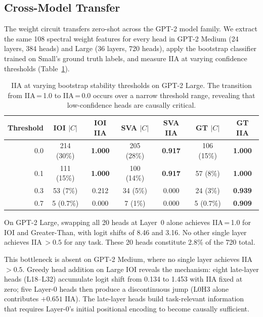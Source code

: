 \documentclass{article}
\newcommand{\NUM}[1]{\textbf{#1}}
\begin{document}
\subsection{Cross-Model Transfer}

The weight circuit transfers zero-shot across the GPT-2 model family.
We extract the same 108 spectral weight features for every head in
GPT-2 Medium (24 layers, 384 heads) and Large (36 layers, 720 heads),
apply the bootstrap classifier trained on Small's ground truth labels,
and measure IIA at varying confidence thresholds
(Table~\ref{tab:cross_model}).

\begin{table}[h]
\centering
\caption{IIA at varying bootstrap stability thresholds on GPT-2 Large.
  The transition from IIA\,=\,1.0 to IIA\,=\,0.0 occurs over a narrow
  threshold range, revealing that low-confidence heads are causally
  critical.}
\label{tab:cross_model}
\begin{tabular}{rcccccc}
\toprule
\textbf{Threshold} & \textbf{IOI $|C|$} & \textbf{IOI IIA} &
  \textbf{SVA $|C|$} & \textbf{SVA IIA} &
  \textbf{GT $|C|$} & \textbf{GT IIA} \\
\midrule
0.0 & 214 (30\%) & \NUM{1.000} & 205 (28\%) & \NUM{0.917} & 106 (15\%) & \NUM{1.000} \\
0.1 & 111 (15\%) & \NUM{1.000} & 100 (14\%) & \NUM{0.917} & 57 (8\%) & \NUM{1.000} \\
0.3 & 53 (7\%) & 0.212 & 34 (5\%) & 0.000 & 24 (3\%) & \NUM{0.939} \\
0.7 & 5 (0.7\%) & 0.000 & 7 (1\%) & 0.000 & 5 (0.7\%) & \NUM{0.909} \\
\bottomrule
\end{tabular}
\end{table}

On GPT-2 Large, swapping all 20 heads at Layer~0 alone achieves
IIA\,=\,1.0 for IOI and Greater-Than, with logit shifts of 8.46 and
3.16. No other single layer achieves IIA\,$> 0.5$ for any task. These
20 heads constitute 2.8\% of the 720 total.

This bottleneck is absent on GPT-2 Medium, where no single layer
achieves IIA\,$> 0.5$. Greedy head addition on Large IOI reveals the
mechanism: eight late-layer heads (L18--L32) accumulate logit shift from
0.134 to 1.453 with IIA fixed at zero; five Layer-0 heads then produce
a discontinuous jump (L0H3 alone contributes $+0.651$ IIA). The late-layer
heads build task-relevant information that requires Layer-0's initial
positional encoding to become causally sufficient.
\end{document}
